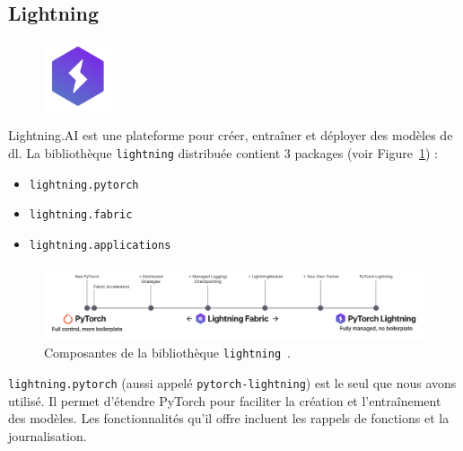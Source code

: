 \subsection{\foreignlanguage{english}{Lightning}}
\label{subsec.lightning}

\begin{figure}
    \vspace*{-\topsep}
    \begin{flushright}
        \includegraphics[width=2cm]{assets/images/lightning.png}
    \end{flushright}
\end{figure}
\foreignlanguage{english}{Lightning.AI} est une plateforme pour créer, entraîner et déployer des modèles de \gls{dl}.
La bibliothèque \verb|lightning| distribuée contient 3 packages (voir Figure~\ref{fig.lightning-structure}) :
\begin{itemize}
    \item \verb|lightning.pytorch| 
    \item \verb|lightning.fabric|
    \item \verb|lightning.applications|
\end{itemize}

\begin{figure}[hbt]
    \begin{center}
        \includegraphics[width=\linewidth]{assets/images/lightning-strcture.png}
    \end{center}
    \cprotect\caption[Composantes de la bibliothèque \verb|lightning|.]%
    {Composantes de la bibliothèque \verb|lightning|~\cite{Falcon_PyTorch_Lightning_2019}.}
    \label{fig.lightning-structure}
\end{figure}

\verb|lightning.pytorch| (aussi appelé \verb|pytorch-lightning|) est le seul que nous avons utilisé.
Il permet d'étendre PyTorch pour faciliter la création et l'entraînement des modèles.
Les fonctionnalités qu'il offre incluent les rappels de fonctions et la journalisation.

